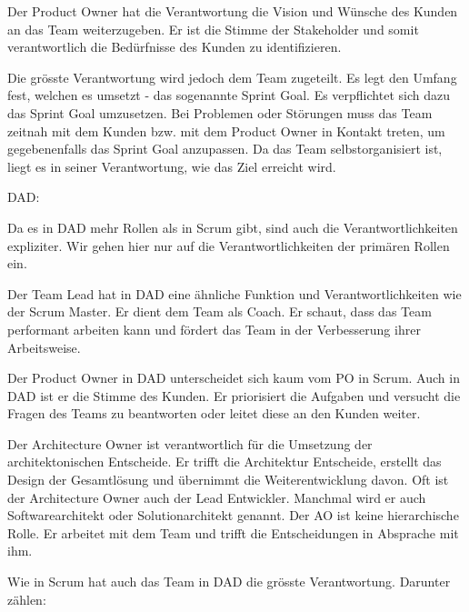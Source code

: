 Der Product Owner hat die Verantwortung die Vision und Wünsche des Kunden an das Team weiterzugeben. Er ist die Stimme der Stakeholder und somit verantwortlich die Bedürfnisse des Kunden zu identifizieren.

Die grösste Verantwortung wird jedoch dem Team zugeteilt. Es legt den Umfang fest, welchen es umsetzt - das sogenannte Sprint Goal. Es verpflichtet sich dazu das Sprint Goal umzusetzen. Bei Problemen oder Störungen muss das Team zeitnah mit dem Kunden bzw. mit dem Product Owner in Kontakt treten, um gegebenenfalls das Sprint Goal anzupassen. Da das Team selbstorganisiert ist, liegt es in seiner Verantwortung, wie das Ziel erreicht wird.

\smallskip
{\Large DAD:}\cite{dadResponsibilites} \medskip

Da es in DAD mehr Rollen als in Scrum gibt, sind auch die Verantwortlichkeiten expliziter.
Wir gehen hier nur auf die Verantwortlichkeiten der primären Rollen ein.

Der Team Lead hat in DAD eine ähnliche Funktion und Verantwortlichkeiten wie der Scrum Master. Er dient dem Team als Coach. Er schaut, dass das Team performant arbeiten kann und fördert das Team in der Verbesserung ihrer Arbeitsweise.

Der Product Owner in DAD unterscheidet sich kaum vom PO in Scrum. Auch in DAD ist er die Stimme des Kunden. Er priorisiert die Aufgaben und versucht die Fragen des Teams zu beantworten oder leitet diese an den Kunden weiter.

Der Architecture Owner ist verantwortlich für die Umsetzung der architektonischen Entscheide. Er trifft die Architektur Entscheide, erstellt das Design der Gesamtlösung und übernimmt die Weiterentwicklung davon. Oft ist der Architecture Owner auch der Lead Entwickler. Manchmal wird er auch Softwarearchitekt oder Solutionarchitekt genannt. Der AO ist keine hierarchische Rolle. Er arbeitet mit dem Team und trifft die Entscheidungen in Absprache mit ihm.

Wie in Scrum hat auch das Team in DAD die grösste Verantwortung. Darunter zählen:

